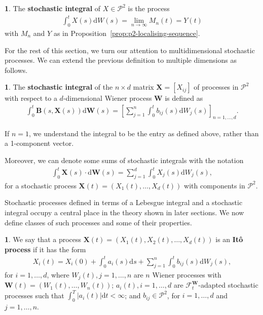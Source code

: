 \documentclass[english]{article}
\numberwithin{equation}{section}
\numberwithin{figure}{section}
\theoremstyle{bolddescit}
\theoremstyle{definition}
\newtheorem{definition}[theorem]{\protect\definitionname}
\theoremstyle{definition}
\theoremstyle{plain}
\theoremstyle{plain}
\theoremstyle{bolddesc}
\theoremstyle{plain}
\theoremstyle{remark}
\providecommand{\definitionname}{Definition}
\begin{document}
\begin{definition}
  The \textbf{stochastic integral} of $X \in \mathcal{P}^2$ is the process
  \begin{align*}
    \int_0^t X(s) \mathrm{d}W(s) = \lim_{n \to \infty} M_n(t) = Y(t)
  \end{align*}
  with $M_n$ and $Y$ as in Proposition~\ref{prop:p2-localising-sequence}.
\end{definition}

For the rest of this section, we turn our attention to multidimensional stochastic processes. We can extend the previous definition to multiple dimensions as follows.

\begin{definition}
  The \textbf{stochastic integral} of the $n \times d$ matrix $\mathbf{X} = [X_{ij}]$ of processes in $\mathcal{P}^2$ with respect to a $d$-dimensional Wiener process $\mathbf{W}$ is defined as
  \begin{align*}
    \int_0^t \mathbf{B}(s,\mathbf{X}(s)) \mathrm{d}\mathbf{W}(s) = \left[
      \sum_{j=1}^{n} \int_0^t b_{ij}(s) \mathrm{d}W_j(s)
    \right]_{n=1,\ldots,d}.
  \end{align*}
\end{definition}

If $n=1$, we understand the integral to be the entry as defined above, rather than a 1-component vector.

Moreover, we can denote some sums of stochastic integrals with the notation
\begin{align*}
  \int_0^t \mathbf{X}(s) \cdot \mathrm{d}\mathbf{W}(s) = \sum_{j=1}^{d} \int_0^t X_j(s) \mathrm{d}W_j(s),
\end{align*}
for a stochastic process $\mathbf{X}(t) = (X_1(t), \ldots, X_d(t))$ with components in $\mathcal{P}^2$.

Stochastic processes defined in terms of a Lebesgue integral and a stochastic integral occupy a central place in the theory shown in later sections. We now define classes of such processes and some of their properties.

\begin{definition}
  We say that a process $\mathbf{X}(t) = (X_1(t), X_2(t), \ldots, X_d(t))$ is an \textbf{It\^o process} if it has the form
  \begin{align}\label{eq:ito-process}
    X_i(t) = X_i(0) + \int_0^t a_i(s) \mathrm{d}s + \sum_{j=1}^n \int_0^t b_{ij}(s) \mathrm{d}W_j(s),
  \end{align}
  for $i=1,\ldots,d$, where $W_j(t), j=1,\ldots,n$ are $n$ Wiener processes with $\mathbf{W}(t) = (W_1(t),\ldots,W_n(t))$; $a_i(t), i=1,\ldots,d$ are $\mathcal{F}^\mathbf{W}_t$-adapted stochastic processes such that $\int_0^T |a_i(t)| \mathrm{d}t < \infty$; and $b_{ij} \in \mathcal{P}^2$, for $i=1,\ldots,d$ and $j=1,\ldots,n$.
\end{definition}
\end{document}
